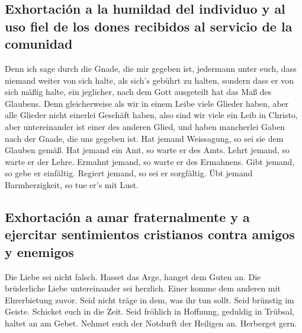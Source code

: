 \hypertarget{exhortaciuxf3n-a-la-humildad-del-individuo-y-al-uso-fiel-de-los-dones-recibidos-al-servicio-de-la-comunidad}{%
\subsection{Exhortación a la humildad del individuo y al uso fiel de los
dones recibidos al servicio de la
comunidad}\label{exhortaciuxf3n-a-la-humildad-del-individuo-y-al-uso-fiel-de-los-dones-recibidos-al-servicio-de-la-comunidad}}

 Denn ich sage durch die Gnade, die mir gegeben ist,
jedermann unter euch, dass niemand weiter von sich halte, als sich's
gebührt zu halten, sondern dass er von sich mäßig halte, ein jeglicher,
nach dem Gott ausgeteilt hat das Maß des Glaubens.  Denn
gleicherweise als wir in einem Leibe viele Glieder haben, aber alle
Glieder nicht einerlei Geschäft haben,  also sind wir
viele ein Leib in Christo, aber untereinander ist einer des anderen
Glied,  und haben mancherlei Gaben nach der Gnade, die uns
gegeben ist.  Hat jemand Weissagung, so sei sie dem
Glauben gemäß. Hat jemand ein Amt, so warte er des Amts. Lehrt jemand,
so warte er der Lehre.  Ermahnt jemand, so warte er des
Ermahnens. Gibt jemand, so gebe er einfältig. Regiert jemand, so sei er
sorgfältig. Übt jemand Barmherzigkeit, so tue er's mit Lust.

\hypertarget{exhortaciuxf3n-a-amar-fraternalmente-y-a-ejercitar-sentimientos-cristianos-contra-amigos-y-enemigos}{%
\subsection{Exhortación a amar fraternalmente y a ejercitar sentimientos
cristianos contra amigos y
enemigos}\label{exhortaciuxf3n-a-amar-fraternalmente-y-a-ejercitar-sentimientos-cristianos-contra-amigos-y-enemigos}}

 Die Liebe sei nicht falsch. Hasset das Arge, hanget dem
Guten an.  Die brüderliche Liebe untereinander sei
herzlich. Einer komme dem anderen mit Ehrerbietung zuvor.
 Seid nicht träge in dem, was ihr tun sollt. Seid
brünstig im Geiste. Schicket euch in die Zeit.  Seid
fröhlich in Hoffnung, geduldig in Trübsal, haltet an am Gebet.
 Nehmet euch der Notdurft der Heiligen an. Herberget
gern.

